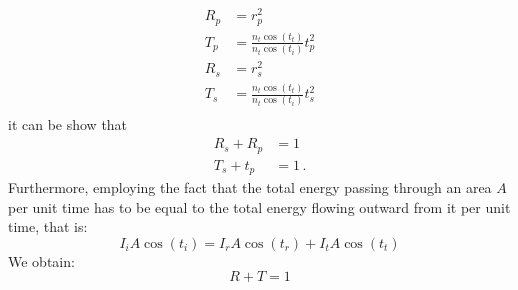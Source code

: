 \begin{equation}
\begin{split}
R_p &= r_p^2\\
T_p &= \frac{n_t \cos(t_t)}{n_t \cos(t_i)}t_p^2\\
R_s &= r_s^2\\
T_s &= \frac{n_t \cos(t_t)}{n_t \cos(t_i)}t_s^2\\
\end{split}
\end{equation}
it can be show that
\begin{equation}
\begin{split}
R_s+R_p &= 1\\
T_s+t_p &=1\,.
\end{split}
\end{equation}
Furthermore, employing the fact that the total energy passing through an area $A$ per unit time has to be equal to the total energy flowing outward from it per unit time, that is:
\begin{equation}
I_i A\cos(t_i) = I_r A\cos(t_r)+I_t A\cos(t_t)
\end{equation}
We obtain:
\begin{equation}
R+T=1
\end{equation}





